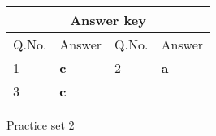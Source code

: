 \setlength\arrayrulewidth{1pt}
\begin{table}[H]
	\centering
	
	\begin{tabular}{|p{1.5cm}|p{1.5cm}||p{1.5cm}|p{1.5cm}|}
		\hline
		\multicolumn{4}{|c|}{\textbf{Answer key}}\\\hline\hline
		\rowcolor{ocrel}Q.No.&Answer&Q.No.&Answer\\\hline
		1&\textbf{c}&2&\textbf{a}\\\hline
		3&\textbf{c}&&\\\hline
	\end{tabular}
\end{table}
\newpage
\begin{abox}
	Practice set 2
	\end{abox}
